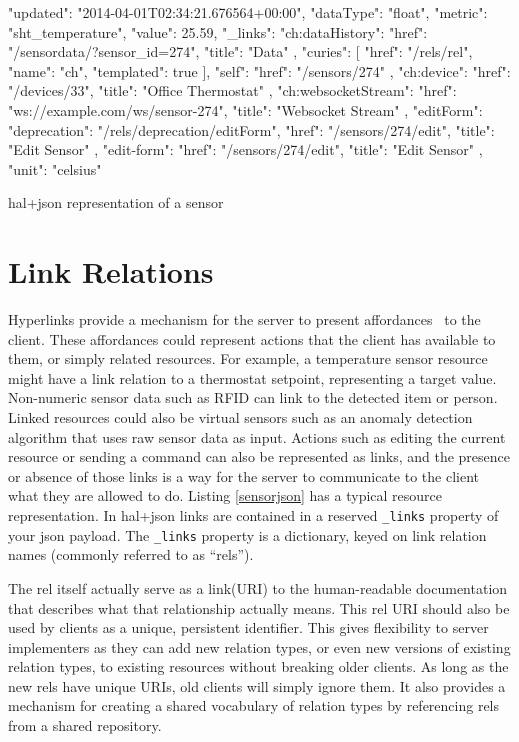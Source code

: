 \documentclass{acm_proc_article-sp}
\begin{document}
\begin{listing}
\begin{jsoncode}
  {
    "updated": "2014-04-01T02:34:21.676564+00:00",
    "dataType": "float",
    "metric": "sht_temperature",
    "value": 25.59,
    "_links": {
      "ch:dataHistory": {
        "href": "/sensordata/?sensor_id=274",
        "title": "Data"
      },
      "curies": [
        {
          "href": "/rels/{rel}",
          "name": "ch",
          "templated": true
        }
      ],
      "self": {
        "href": "/sensors/274"
      },
      "ch:device": {
        "href": "/devices/33",
        "title": "Office Thermostat"
      },
      "ch:websocketStream": {
        "href": "ws://example.com/ws/sensor-274",
        "title": "Websocket Stream"
      },
      "editForm": {
        "deprecation": "/rels/deprecation/editForm",
        "href": "/sensors/274/edit",
        "title": "Edit Sensor"
      },
      "edit-form": {
        "href": "/sensors/274/edit",
        "title": "Edit Sensor"
      }
    },
    "unit": "celsius"
  }
\end{jsoncode}
\caption{hal+json representation of a sensor}
\label{sensorjson}
\end{listing}

\section{Link Relations}

Hyperlinks provide a mechanism for the server to present
affordances~\cite{gibson} to the client. These affordances could represent
actions that the client has available to them, or simply related resources. For
example, a temperature sensor resource might have a link relation to a
thermostat setpoint, representing a target value. Non-numeric sensor data such
as RFID can link to the detected item or person. Linked resources could also be
virtual sensors such as an anomaly detection algorithm that uses raw sensor
data as input. Actions such as editing the current resource or sending a
command can also be represented as links, and the presence or absence of those
links is a way for the server to communicate to the client what they are
allowed to do. Listing \ref{sensorjson} has a typical resource representation.
In hal+json links are contained in a reserved \texttt{\_links} property of your
json payload. The \texttt{\_links} property is a dictionary, keyed on link
relation names (commonly referred to as ``rels'').

The rel itself actually serve as a link(URI) to the human-readable
documentation that describes what that relationship actually means. This rel
URI should also be used by clients as a unique, persistent identifier. This
gives flexibility to server implementers as they can add new relation types, or
even new versions of existing relation types, to existing resources without
breaking older clients. As long as the new rels have unique URIs, old clients
will simply ignore them. It also provides a mechanism for creating a shared
vocabulary of relation types by referencing rels from a shared repository.
\end{document}
